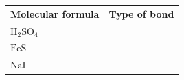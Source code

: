 \begin{enumerate}[noitemsep, label=\textbf{\arabic*}. ]
{{\begin{center}
\begin{tabular}[t]{|l|l|}
        \textbf{Molecular formula} &
    
    
        \textbf{Type of bond}%
     \tabularnewline\cline{1-1}\cline{2-2}
    
    
        \begin{math}\mathrm{H}{}_{2}\mathrm{SO}{}_{4}\end{math} &
    
    
     \tabularnewline\cline{1-1}\cline{2-2}
    
    
        \begin{math}\mathrm{FeS}\end{math} &
    
    
     \tabularnewline\cline{1-1}\cline{2-2}
    
    
        \begin{math}\mathrm{NaI}\end{math} &
    

\end{tabular}
\end{center}}}
\end{enumerate}

